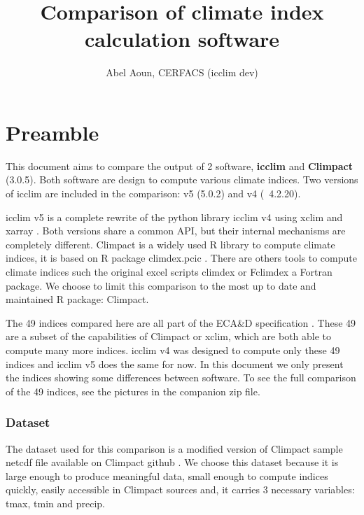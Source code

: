 \documentclass[a4paper,11pt]{article}
\title{Comparison of climate index calculation software}
\author{Abel Aoun, CERFACS (icclim dev)}
\begin{document}
\maketitle
\part*{Preamble}
    This document aims to compare the output of 2 software, \textbf{icclim} \cite{gh/icclim} and \textbf{Climpact} \cite{gh/Climpact} (3.0.5). Both software are design to compute various climate indices.
    Two versions of icclim are included in the comparison: v5 (5.0.2) and v4 (~4.2.20).

    icclim v5 is a complete rewrite of the python library icclim v4 using xclim \cite{gh/xclim} and xarray \cite{gh/xarray}. Both versions share a common API, but their internal mechanisms are completely different.
    Climpact is a widely used R library to compute climate indices, it is based on R package climdex.pcic \cite{gh/climdex}.
    There are others tools to compute climate indices such the original excel scripts climdex \cite{doc/climdex} or Fclimdex \cite{gh/fclimdex} a Fortran package.
    We choose to limit this comparison to the most up to date and maintained R package: Climpact.

    The 49 indices compared here are all part of the ECA\&D specification \cite{doc/ecad_new}.
    These 49 are a subset of the capabilities of Climpact or xclim, which are both able to compute many more indices.
    icclim v4 was designed to compute only these 49 indices and icclim v5 does the same for now.
    In this document we only present the indices showing some differences between software.
    To see the full comparison of the 49 indices, see the pictures in the companion zip file.

    \section{Dataset}
        The dataset used for this comparison is a modified version of Climpact sample netcdf file available on Climpact github \cite{gh/Climpact}.
        We choose this dataset because it is large enough to produce meaningful data, small enough to compute indices quickly, 
        easily accessible in Climpact sources and, it carries 3 necessary variables: tmax, tmin and precip.
\end{document}
